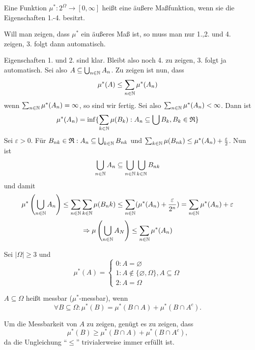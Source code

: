 			\begin{defi}
				Eine Funktion $\mu^*: 2^\Omega \to [0,\infty]$ heißt eine äußere Maßfunktion, wenn sie die Eigenschaften 1.-4. besitzt.
			\end{defi}	
			
			\begin{bem}
				Will man zeigen, dass $\mu^*$ ein äußeres Maß ist, so muss man nur 1.,2. und 4. zeigen, 3. folgt dann automatisch. 
			\end{bem}
			
			\begin{bew}
				Eigenschaften 1. und 2. sind klar. Bleibt also noch 4. zu zeigen, 3. folgt ja automatisch. \newline
				Sei also $A\subseteq \bigcup_{n\in\mathbb{N}} A_n$. Zu zeigen ist nun, dass 
				\[ \mu^* (A)\le \sum_{n\in\mathbb{N}} \mu^*(A_n) \]
				wenn $\sum_{n\in\mathbb{N}} \mu^*(A_n)=\infty$, so sind wir fertig.\newline
				Sei also $\sum_{n\in\mathbb{N}} \mu^*(A_n)<\infty$. Dann ist
				\[ \mu^*(A_n)=\inf\{\sum_{k\in\mathbb{N}}\mu(B_k): A_n\subseteq \bigcup B_k, B_k\in\mathfrak{R}\} \]
				Sei $\varepsilon >0$. Für $B_{nk}\in\mathfrak{R}: A_n\subseteq\bigcup_{k\in\mathbb{N}} B_{nk}$ und $\sum_{k\in\mathbb{N}} \mu(B_{nk})\le \mu^*(A_n)+\frac{\varepsilon}{2}$. Nun ist
				\[ \bigcup_{n\in\mathbb{N}} A_n\subseteq \bigcup_{n\in\mathbb{N}}\bigcup_{k\in\mathbb{N}} B_{nk} \]
				und damit
				\[ \mu^*\left(\bigcup_{n\in\mathbb{N}} A_n\right)\le \sum_{n\in\mathbb{N}}\sum_{k\in\mathbb{N}} \mu(B_nk) \le \sum_{n\in\mathbb{N}} (\mu^*(A_n)+\frac{\varepsilon}{2^n})=\sum_{n\in\mathbb{N}} \mu^* (A_n)+\varepsilon \]
				\[ \Rightarrow \mu\left(\bigcup_{n\in\mathbb{N}}A_N\right)\le\sum_{n\in\mathbb{N}} \mu^* (A_n) \]
				\arge
			\end{bew}
			
			\begin{bsp}
				Sei $|\Omega|\ge 3$ und 
				$$\mu^*(A)=\left\{\begin{array}{l}
					0: A=\varnothing\\
					1: A\notin\{\varnothing, \Omega\}, A\subseteq\Omega\\
					2: A=\Omega
				\end{array}\right. $$
			\end{bsp}
			
			\begin{defi}
				$A\subseteq \Omega$ heißt messbar ($\mu^*$-messbar), wenn 
				\[ \forall B\subseteq \Omega: \mu^*(B)=\mu^*(B\cap A)+\mu^*(B\cap A^c). \]
			\end{defi}
			
			\begin{bem}
				Um die Messbarkeit von $A$ zu zeigen, genügt es zu zeigen, dass
				\[ \mu^*(B)\ge \mu^*(B\cap A)+\mu^*(B\cap A^c), \]
				da die Ungleichung "`$\le$"' trivialerweise immer erfüllt ist. 
			\end{bem}
			

